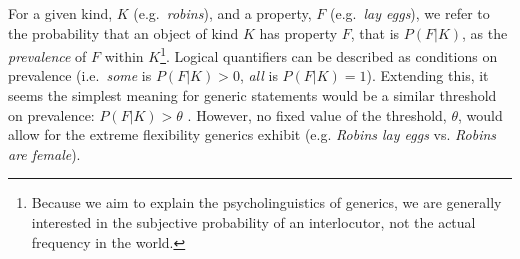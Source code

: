 \documentclass[10pt,letterpaper]{article}
\begin{document}

For a given kind, $K$ (e.g.~\emph{robins}), and a property, $F$ (e.g.~\emph{lay eggs}), we refer to the probability that an object of kind $K$ has property $F$, that is $P(F|K)$, as the \emph{prevalence} of $F$ within $K$\footnote{Because we aim to explain the psycholinguistics of generics, we are generally interested in the subjective probability of an interlocutor, not the actual frequency in the world.}.
Logical quantifiers can be described as conditions on prevalence (i.e.~\emph{some} is $P(F|K)>0$, \emph{all} is $P(F|K)=1$). 
Extending this, it seems the simplest meaning for generic statements would be a similar threshold on prevalence: $P(F|K)>\theta$ \cite{Cohen1999}. 
However, no fixed value of the threshold, $\theta$, would allow for the extreme flexibility generics exhibit (e.g. \emph{Robins lay eggs} vs. \emph{Robins are female}). 
\end{document}
